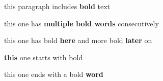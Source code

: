 

this paragraph includes \textbf{bold}  text

this one has \textbf{multiple bold words} consecutively

this one has bold \textbf{here} and more bold \textbf{later} on

\textbf{this} one starts with bold

this one ends with a bold \textbf{word}